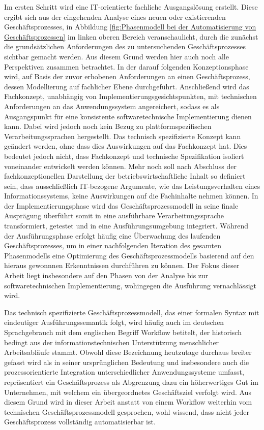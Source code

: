 Im ersten Schritt wird eine \ac{IT}-orientierte fachliche Ausgangslösung erstellt.
Diese ergibt sich aus der eingehenden Analyse eines neuen oder existierenden Geschäftsprozesses, in Abbildung \ref{fig:Phasenmodell bei der Automatisierung von Geschäftsprozessen} im linken oberen Bereich veranschaulicht, durch die zunächst die grundsätzlichen Anforderungen des zu untersuchenden Geschäftsprozesses sichtbar gemacht werden. 
Aus diesem Grund werden hier auch noch alle Perspektiven zusammen betrachtet.
In der darauf folgenden Konzeptionsphase wird, auf Basis der zuvor erhobenen Anforderungen an einen Geschäftsprozess, dessen Modellierung auf fachlicher Ebene durchgeführt. Anschließend wird das Fachkonzept, unabhängig von Implementierungsgesichtspunkten, mit technischen Anforderungen an das Anwendungssystem angereichert, sodass es als Ausgangspunkt für eine konsistente softwaretechnische Implementierung dienen kann. 
Dabei wird jedoch noch kein Bezug zu plattformspezifischen Verarbeitungssprachen hergestellt. 
Das technisch spezifizierte Konzept kann geändert werden, ohne dass dies Auswirkungen auf das Fachkonzept hat.
Dies bedeutet jedoch nicht, dass Fachkonzept und technische Spezifikation isoliert voneinander entwickelt werden können. 
Mehr noch soll nach Abschluss der fachkonzeptionellen Darstellung der betriebswirtschaftliche Inhalt so definiert sein, dass ausschließlich \ac{IT}-bezogene Argumente, wie das Leistungsverhalten eines Informationssystems, keine Auswirkungen auf die Fachinhalte nehmen können. 
In der Implementierungsphase wird das Geschäftsprozessmodell in seine finale Ausprägung überführt somit in eine ausführbare Verarbeitungssprache transformiert, getestet und in eine Ausführungsumgebung integriert.
Während der Ausführungsphase erfolgt häufig eine Überwachung des laufenden Geschäftsprozesses, um in einer nachfolgenden Iteration des gesamten Phasenmodells eine Optimierung des Geschäftsprozessmodells basierend auf den hieraus gewonnnen Erkenntnissen durchführen zu können.
Der Fokus dieser Arbeit liegt insbesondere auf den Phasen von der Analyse bis zur softwaretechnischen Implementierung, wohingegen die Ausführung vernachlässigt wird.











Das technisch spezifizierte Geschäftsprozessmodell, das einer formalen Syntax mit eindeutiger Ausführungssemantik folgt, wird häufig auch im deutschen Sprachgebrauch mit dem englischen Begriff Workflow betitelt, der historisch bedingt aus der informationstechnischen Unterstützung menschlicher Arbeitsabläufe stammt. 
Obwohl diese Bezeichnung heutzutage durchaus breiter gefasst wird als in seiner ursprünglichen Bedeutung und insbesondere auch die prozessorientierte Integration unterschiedlicher Anwendungssysteme umfasst, repräsentiert ein Geschäftsprozess als Abgrenzung dazu ein höherwertiges Gut im Unternehmen, mit welchem ein übergeordnetes Geschäftsziel verfolgt wird. 
Aus diesem Grund wird in dieser Arbeit anstatt von einem Workflow weiterhin vom technischen Geschäftsprozessmodell gesprochen, wohl wissend, dass nicht jeder Geschäftsprozess vollständig automatisierbar ist.

